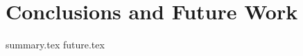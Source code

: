 \documentclass[../thesis.tex]{subfiles}
\begin{document}
\chapter{Conclusions and Future Work}\label{chp:future_work}

{summary.tex}
{future.tex}
\end{document}
